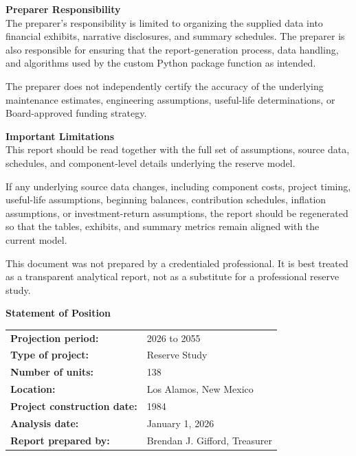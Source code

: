 \documentclass[11pt,letterpaper]{article}
\newcommand{\sectionrule}{\par\vspace{0.2em}{\color{linegray}\rule{\linewidth}{0.6pt}}\par\vspace{0.6em}}
\newcommand{\reportsection}[1]{%
  \par\vspace{0.2em}%
  \addcontentsline{toc}{section}{#1}%
  {{\Large\bfseries\color{sectionblue} #1\par}}%
  \sectionrule
}
\newcommand{\subnote}[1]{\vspace{0.3em}\colorbox{softgray}{\parbox{0.97\linewidth}{\small #1}}\vspace{0.4em}}
\begin{document}
{\bfseries Preparer Responsibility}\\
The preparer’s responsibility is limited to organizing the supplied data into financial exhibits, narrative disclosures, and summary schedules. The preparer is also responsible for ensuring that the report-generation process, data handling, and algorithms used by the custom Python package function as intended.

The preparer does not independently certify the accuracy of the underlying maintenance estimates, engineering assumptions, useful-life determinations, or Board-approved funding strategy.

{\bfseries Important Limitations}\\
This report should be read together with the full set of assumptions, source data, schedules, and component-level details underlying the reserve model.

If any underlying source data changes, including component costs, project timing, useful-life assumptions, beginning balances, contribution schedules, inflation assumptions, or investment-return assumptions, the report should be regenerated so that the tables, exhibits, and summary metrics remain aligned with the current model.

\subnote{This document was not prepared by a credentialed professional. It is best treated as a transparent analytical report, not as a substitute for a professional reserve study.}

\newpage
\reportsection{Statement of Position}
\begin{tabularx}{\linewidth}{>{\bfseries}l X}
Projection period: & 2026 to 2055 \\
Type of project: & Reserve Study \\
Number of units: & 138 \\
Location: & Los Alamos, New Mexico \\
Project construction date: & 1984 \\
Analysis date: & January 1, 2026 \\
Report prepared by: & Brendan J. Gifford, Treasurer \\
\end{tabularx}
\end{document}
